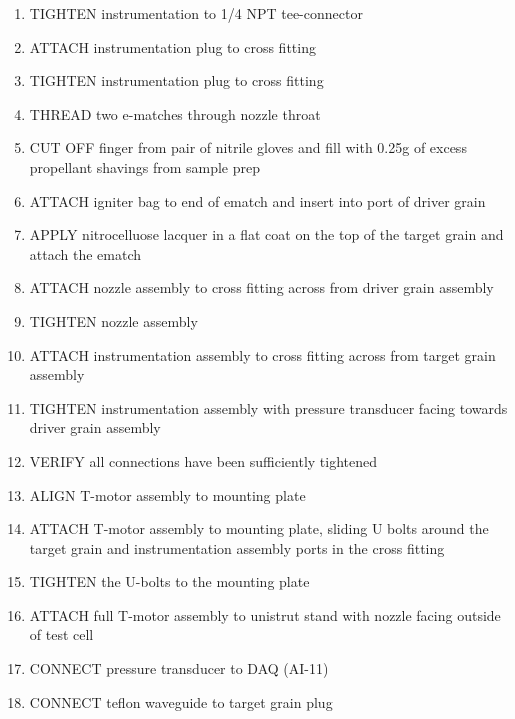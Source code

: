 \begin{enumerate}
    \item TIGHTEN instrumentation to 1/4 NPT tee-connector
    \item ATTACH instrumentation plug to cross fitting
    \item TIGHTEN instrumentation plug to cross fitting
    \item THREAD two e-matches through nozzle throat
    \item CUT OFF finger from pair of nitrile gloves and fill with 0.25g of excess propellant shavings from sample prep
    \item ATTACH igniter bag to end of ematch and insert into port of driver grain
    \item APPLY nitrocelluose lacquer in a flat coat on the top of the target grain and attach the ematch
    \item ATTACH nozzle assembly to cross fitting across from driver grain assembly
    \item TIGHTEN nozzle assembly
    \item ATTACH instrumentation assembly to cross fitting across from target grain assembly
    \item TIGHTEN instrumentation assembly with pressure transducer facing towards driver grain assembly
    \item VERIFY all connections have been sufficiently tightened
    \item ALIGN T-motor assembly to mounting plate
    \item ATTACH T-motor assembly to mounting plate, sliding U bolts around the target grain and instrumentation assembly ports in the cross fitting
    \item TIGHTEN the U-bolts to the mounting plate
    \item ATTACH full T-motor assembly to unistrut stand with nozzle facing outside of test cell
    \item CONNECT pressure transducer to DAQ (AI-11)
    \item CONNECT teflon waveguide to target grain plug
\end{enumerate}

